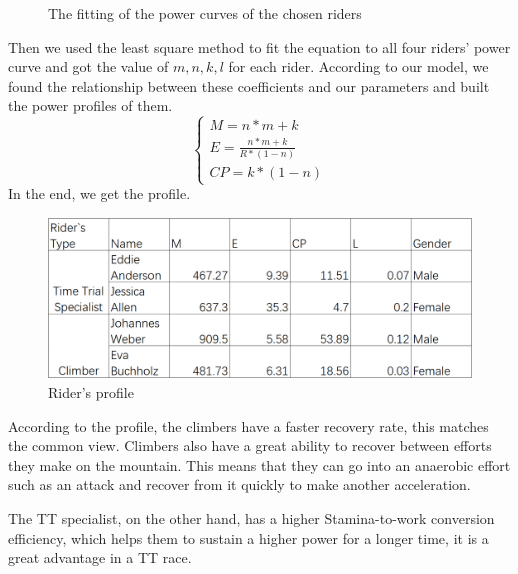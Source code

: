 \documentclass[12pt]{article}
\begin{document}
\begin{figure}[H]
    \centering

    \caption{The fitting of the power curves of the chosen riders}
\end{figure}
Then we used the least square method to fit the equation to all four riders' power curve and  %
got the value of $m,n,k,l$ for each rider. According to our model, we found the relationship between these
coefficients and our parameters and built the power profiles of them.
\begin{equation}
    \left\{
    \begin{array}{c}
        M=n*m+k                 \\
        E=\frac{n*m+k}{R*(1-n)} \\
        CP=k*(1-n)
    \end{array}
    \right.
\end{equation}
In the end, we get the profile.
\begin{figure}
    \centering
    \includegraphics[width=.8\columnwidth]{Rider's profile.jpg}
    \caption{Rider's profile}
\end{figure}
According to the profile, the climbers have a faster recovery rate, this matches the common view. Climbers also have a great ability to recover between efforts they make on
the mountain. This means that they can go into an anaerobic effort such as an attack and recover from it quickly to make another acceleration.

The TT specialist, on the other hand, has a higher Stamina-to-work conversion efficiency, which helps them to sustain a higher power for a longer time, it is a great advantage
in a TT race.
\end{document}
